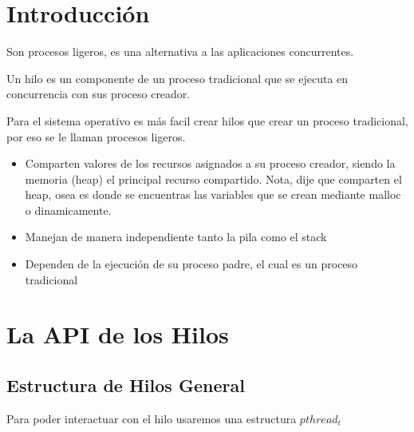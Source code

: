 \documentclass[12pt, fleqn]{report}                             %
\begin{document}
        \section{Introducción}

            Son procesos ligeros, es una alternativa a las aplicaciones concurrentes.

            Un hilo es un componente de un proceso tradicional que se ejecuta en concurrencia con
            sus proceso creador.

            Para el sistema operativo es más facil crear hilos que crear un proceso tradicional, por eso se
            le llaman procesos ligeros.

            \begin{itemize}
                \item Comparten valores de los recursos asignados a su proceso creador,
                    siendo la memoria (heap) el principal recurso compartido. Nota, dije que comparten
                    el heap, osea es donde se encuentras las variables que se crean mediante malloc o
                    dinamicamente.

                \item Manejan de manera independiente tanto la pila como el stack
                
                \item Dependen de la ejecución de su proceso padre, el cual es un proceso tradicional

            \end{itemize}

        \clearpage
        \section{La API de los Hilos}

            \subsection{Estructura de Hilos General}

                Para poder interactuar con el hilo usaremos una estructura $pthread_t$
\end{document}
